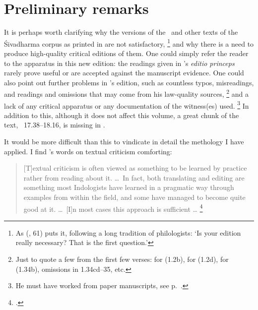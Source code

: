 \section{Preliminary remarks}

It is perhaps worth clarifying why the versions of the \VSS\ and other texts of
the Śivadharma corpus as printed in  are not satisfactory,%
		\footnote{As \citeauthor{WestTextual} (\citeyear{WestTextual}, 61) 
			puts it, following a long tradition of philologists:
			`Is your edition really necessary? That is the first question.'}
and why there is a need to produce high-quality critical editions of them.
One could simply refer the reader to the apparatus in
this new edition: the readings given in \citeauthor{NaraharinathSivadharma}'s 
\emph{editio princeps} rarely prove useful or are 
accepted against the manuscript evidence.
One could also point out further problems in 
\citeauthor{NaraharinathSivadharma}'s edition, such
as countless typos, misreadings, and readings and omissions that 
may come from his law-quality sources,%
		\footnote{Just to quote a few from the first few verses:
								 for  (1.2b),
								 for  (1.2d),
								 for  (1.34b), omissions in 1.34cd--35, etc.}
and a lack of any critical apparatus or any documentation of the witness(es) used.%
		\footnote{He must have worked from paper manuscripts,
								see p.~\pageref{narahari_paperms}.}
In addition to this, although it does not affect this volume,
a great chunk of the text, \VSS\ 17.38--18.16, is
missing in \citeauthor{NaraharinathSivadharma}.

It would be more difficult than this to vindicate in detail the methology
I have applied. I find \citeauthor{HannederIntro}'s 
words on textual criticism comforting:

\begin{quote}
[T]extual criticism is often viewed as something to be learned by practice rather from reading about it.
\dots\ In fact, both translating and editing are something most Indologists have learned in a pragmatic
way through examples from within the field, and some have managed to become quite good at it.
\dots\ [I]n most cases this approach is sufficient \dots%
		\footnote{.}
\end{quote}

